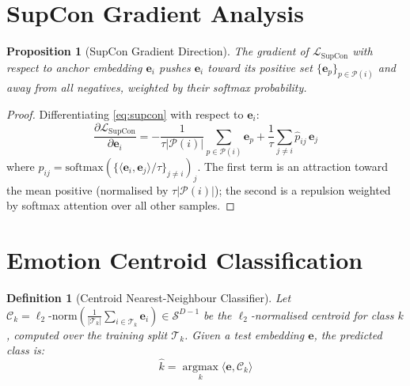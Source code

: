 \documentclass[10pt,conference]{IEEEtran}
\theoremstyle{ieeethm}
\newtheorem{proposition}[theorem]{Proposition}
\theoremstyle{ieeedef}
\newtheorem{definition}[theorem]{Definition}
\theoremstyle{ieeeremark}
\begin{document}
\section{SupCon Gradient Analysis}
\label{app:supcon_grad}

\begin{proposition}[SupCon Gradient Direction]
\label{prop:supcon_grad}
The gradient of $\mathcal{L}_{\text{SupCon}}$ with respect to anchor embedding $\mathbf{e}_i$ pushes $\mathbf{e}_i$ toward its positive set $\{\mathbf{e}_p\}_{p \in \mathcal{P}(i)}$ and away from all negatives, weighted by their softmax probability.
\end{proposition}
\begin{proof}
Differentiating \eqref{eq:supcon} with respect to $\mathbf{e}_i$:
\[
\frac{\partial \mathcal{L}_\text{SupCon}}{\partial \mathbf{e}_i} =
-\frac{1}{\tau|\mathcal{P}(i)|}\sum_{p \in \mathcal{P}(i)}\mathbf{e}_p
+\frac{1}{\tau}\sum_{j \neq i} \hat{p}_{ij}\,\mathbf{e}_j
\]
where $\hat{p}_{ij} = \text{softmax}(\{\langle\mathbf{e}_i,\mathbf{e}_j\rangle/\tau\}_{j\neq i})_j$. The first term is an attraction toward the mean positive (normalised by $\tau|\mathcal{P}(i)|$); the second is a repulsion weighted by softmax attention over all other samples.
\end{proof}

\section{Emotion Centroid Classification}
\label{app:centroid}

\begin{definition}[Centroid Nearest-Neighbour Classifier]
\label{def:centroid}
Let $\mathcal{C}_k = \ell_2\text{-norm}\!\left(\frac{1}{|\mathcal{T}_k|}\sum_{i \in \mathcal{T}_k}\mathbf{e}_i\right) \in \mathcal{S}^{D-1}$ be the $\ell_2$-normalised centroid for class $k$, computed over the training split $\mathcal{T}_k$. Given a test embedding $\mathbf{e}$, the predicted class is:
\begin{equation}
\hat{k} = \operatorname*{argmax}_{k} \langle \mathbf{e}, \mathcal{C}_k \rangle
\label{eq:centroid_cls}
\end{equation}
\end{definition}
\end{document}
